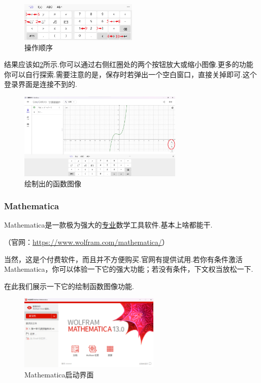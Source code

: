 \documentclass[lang=cn,math=cm,chinesefont=nofont,11pt,scheme=chinese,twocol]{elegantbook}
\begin{document}
\begin{figure}[h]
  \centering
  \includegraphics[width=0.5\textwidth]{image/geogebra3.png}
  \caption{操作顺序}
  \label{img:geogebra3}
\end{figure}

结果应该如\ref{img:geogebra4}所示.你可以通过右侧红圈处的两个按钮放大或缩小图像.更多的功能你可以自行探索.需要注意的是，保存时若弹出一个空白窗口，直接关掉即可.这个登录界面是连接不到的.

\begin{figure}[h]
  \centering
  \includegraphics[width=0.7\textwidth]{image/geogebra4.png}
  \caption{绘制出的函数图像}
  \label{img:geogebra4}
\end{figure}

\subsubsection{Mathematica}

Mathematica是一款极为强大的\underline{专业}数学工具软件.基本上啥都能干.

（官网：\href{https://www.wolfram.com/mathematica/}{https://www.wolfram.com/mathematica/}）

当然，这是个付费软件，而且并不方便购买.官网有提供试用.若你有条件激活Mathematica，你可以体验一下它的强大功能；若没有条件，下文权当放松一下.

在此我们展示一下它的绘制函数图像功能.

\begin{figure}[h]
  \centering
  \includegraphics[width=0.6\textwidth]{image/mathematica1.png}
  \caption{Mathematica启动界面}
  \label{img:mathematica1}
\end{figure}
\end{document}
